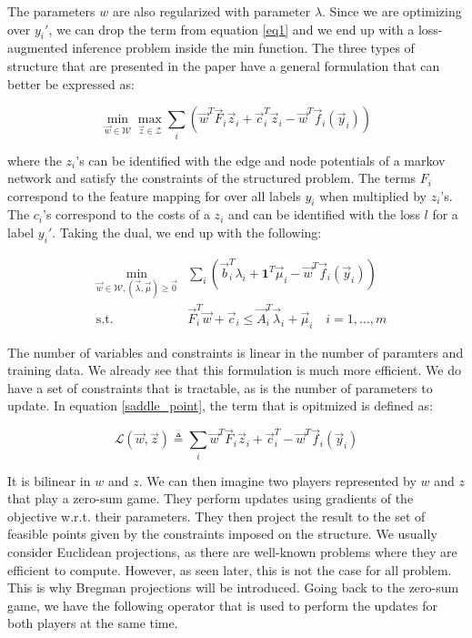 The parameters $w$ are also regularized with parameter $\lambda$. Since we are
optimizing over $y_i'$, we can drop the term from equation \ref{eq1} and we end
up with a loss-augmented inference problem inside the min function. The three
types of structure that are presented in the paper have a general formulation
that can better be expressed as:

\begin{equation}
  \min_{\vec w \in \mathcal{W}} \max_{\vec z \in \mathcal{Z}} \sum_i \left( \vec
w^T \vec F_i \vec z_i + \vec c_i^T \vec z_i - \vec w^T \vec f_i(\vec y_i)
\right)
  \label{saddle_point}
\end{equation}

where the $z_i$'s can be identified with the edge and node potentials of a
markov network and satisfy the constraints of the structured problem. The terms
$F_i$ correspond to the feature mapping for over all labels $y_i$ when
multiplied by $z_i$'s. The $c_i$'s correspond to the costs of a $z_i$ and can be
identified with the loss $l$ for a label $y_i'$. Taking the dual, we end up with
the following:

\begin{equation}
  \begin{aligned}
    &\min_{\vec w \in \mathcal{W}, (\vec \lambda,\vec \mu) \geq \vec 0} &\sum_i
\left( \vec b_i^T \lambda_i + \mathbf{1}^T \vec \mu_i - \vec w^T \vec f_i(\vec
y_i) \right)\\ &\text{s.t.} &\vec F_i^T \vec w + \vec c_i \leq \vec A_i^T \vec
\lambda_i + \vec \mu_i \quad i=1,\dots,m
  \end{aligned}
\end{equation}

The number of variables and constraints is linear in the number of paramters and
training data. We already see that this formulation is much more efficient. We
do have a set of constraints that is tractable, as is the number of parameters
to update. In equation \ref{saddle_point}, the term that is opitmized is defined
as:

\begin{equation}
  \mathcal{L}(\vec w,\vec z) \triangleq \sum_i \vec w^T \vec F_i \vec z_i + \vec
c_i^T - \vec w^T \vec f_i(\vec y_i)
  \label{saddle_obj}
\end{equation}

It is bilinear in $w$ and $z$. We can then imagine two players represented by
$w$ and $z$ that play a zero-sum game. They perform updates using gradients of
the objective w.r.t. their parameters. They then project the result to the set
of feasible points given by the constraints imposed on the structure. We usually
consider Euclidean projections, as there are well-known problems where they are
efficient to compute. However, as seen later, this is not the case for all
problem. This is why Bregman projections will be introduced. Going back to the
zero-sum game, we have the following operator that is used to perform the
updates for both players at the same time.

